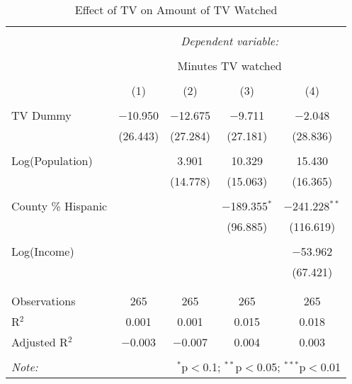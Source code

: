 
\begin{table}[!htbp] \centering 
  \caption{Effect of TV on Amount of TV Watched} 
  \label{} 
\begin{tabular}{@{\extracolsep{-5pt}}lcccc} 
\\[-1.8ex]\hline 
\hline \\[-1.8ex] 
 & \multicolumn{4}{c}{\textit{Dependent variable:}} \\ 
\cline{2-5} 
\\[-1.8ex] & \multicolumn{4}{c}{Minutes TV watched} \\ 
\\[-1.8ex] & (1) & (2) & (3) & (4)\\ 
\hline \\[-1.8ex] 
 TV Dummy & $-$10.950 & $-$12.675 & $-$9.711 & $-$2.048 \\ 
  & (26.443) & (27.284) & (27.181) & (28.836) \\ 
  & & & & \\ 
 Log(Population) &  & 3.901 & 10.329 & 15.430 \\ 
  &  & (14.778) & (15.063) & (16.365) \\ 
  & & & & \\ 
 County \% Hispanic &  &  & $-$189.355$^{*}$ & $-$241.228$^{**}$ \\ 
  &  &  & (96.885) & (116.619) \\ 
  & & & & \\ 
 Log(Income) &  &  &  & $-$53.962 \\ 
  &  &  &  & (67.421) \\ 
  & & & & \\ 
\hline \\[-1.8ex] 
Observations & 265 & 265 & 265 & 265 \\ 
R$^{2}$ & 0.001 & 0.001 & 0.015 & 0.018 \\ 
Adjusted R$^{2}$ & $-$0.003 & $-$0.007 & 0.004 & 0.003 \\ 
\hline 
\hline \\[-1.8ex] 
\textit{Note:}  & \multicolumn{4}{r}{$^{*}$p$<$0.1; $^{**}$p$<$0.05; $^{***}$p$<$0.01} \\ 
\end{tabular} 
\end{table} 

